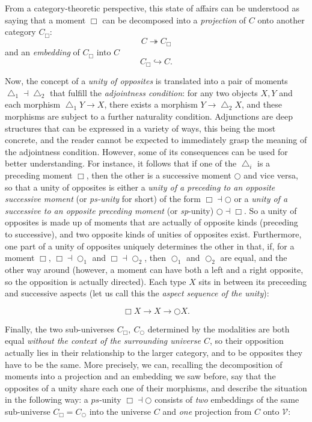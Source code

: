 \documentclass{article}
\begin{document}
From a category-theoretic
perspective, this state of affairs can be understood as saying that a moment $\Box$ can be decomposed into a \emph{projection}
of $C$ onto another category $C_\Box:$
$$C\twoheadrightarrow C_\Box$$
and an \emph{embedding} of $C_\Box$ into $C$ $$C_\Box\hookrightarrow C.$$

Now, the concept of a \emph{unity of opposites} is translated into a pair of moments $\bigtriangleup_1\dashv\bigtriangleup_2$
that fulfill the \emph{adjointness condition}: for any two objects $X,Y$ and each morphism $\bigtriangleup_1
Y\rightarrow X$, there exists a morphism $Y\rightarrow \bigtriangleup_2 X$, and these morphisms are subject to a further
naturality condition. Adjunctions are deep structures that can be expressed in a variety of ways, this
being the most concrete, and the reader cannot be expected to immediately grasp the meaning of the adjointness
condition. However, some of its consequences can be used for better understanding. For instance, it follows
that if one of the $\bigtriangleup_i$ is a preceding moment $\Box$, then the other is a successive moment
$\bigcirc$ and vice versa, so that a unity of opposites is either a \emph{unity of a preceding to an opposite
successive moment} (or \emph{ps-unity} for  short) of the form $\Box\dashv\bigcirc$ or a \emph{unity of
a successive to an opposite preceding moment} (or \emph{sp}-unity) $\bigcirc\dashv\Box$. So a unity of
opposites is made up of moments that are actually of opposite kinds (preceding to successive), and two
opposite kinds of unities of opposites exist. Furthermore, one part of a unity of opposites uniquely
determines
the other in that, if, for a moment $\Box$, $\Box\dashv\bigcirc_1$ and $\Box\dashv\bigcirc_2$, then $\bigcirc_1$ and $\bigcirc_2$
are equal, and the other way around (however, a moment can have both a left and a right opposite, so the
opposition is actually directed). Each type $X$ sits in between its preceeding and successive aspects
(let us call this the \emph{aspect sequence of the unity}): 

$$\Box X\rightarrow X \rightarrow\bigcirc X.$$

Finally, the two sub-universes $C_\Box ,\ C_\bigcirc$ determined by the modalities are both equal \emph{without
the context of the surrounding universe $C$}, so their opposition actually lies in their relationship
to the larger category, and to be opposites they have to be the same. More precisely, we can, recalling
the decomposition of moments into a projection and an embedding we saw before, say that the opposites
of a unity share each one of their morphisms, and describe the situation in the following way: a $ps$-unity
$\Box\dashv\bigcirc$ consists of \emph{two} embeddings of the same sub-universe $C_\Box=C_\bigcirc$ into
the universe $C$ and \emph{one} projection from $C$ onto $\mathcal{V}$:
\end{document}
